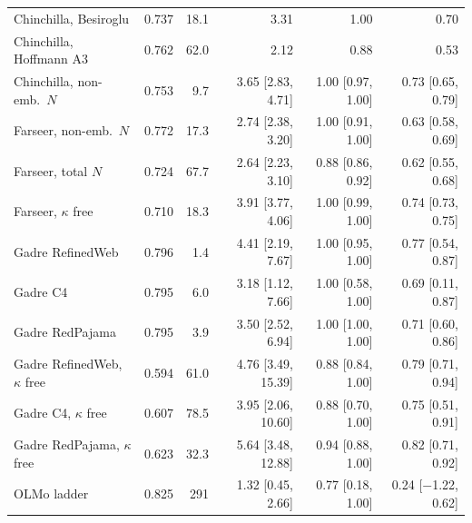 \begin{table}[tp]
{\begin{tabular}{@{}lrrrrrrr@{}}
Chinchilla, Besiroglu & 0.737 & 18.1 & \multicolumn{2}{r}{3.31} & \multicolumn{2}{r}{1.00} & 0.70 \\
Chinchilla, Hoffmann A3 & 0.762 & 62.0 & \multicolumn{2}{r}{2.12} & \multicolumn{2}{r}{0.88} & 0.53 \\
Chinchilla, non-emb.\ $N$ & 0.753 & 9.7 & \multicolumn{2}{r}{3.65 {\scriptsize[2.83, 4.71]}} & \multicolumn{2}{r}{1.00 {\scriptsize[0.97, 1.00]}} & 0.73 {\scriptsize[0.65, 0.79]} \\
Farseer, non-emb.\ $N$ & 0.772 & 17.3 & \multicolumn{2}{r}{2.74 {\scriptsize[2.38, 3.20]}} & \multicolumn{2}{r}{1.00 {\scriptsize[0.91, 1.00]}} & 0.63 {\scriptsize[0.58, 0.69]} \\
Farseer, total $N$ & 0.724 & 67.7 & \multicolumn{2}{r}{2.64 {\scriptsize[2.23, 3.10]}} & \multicolumn{2}{r}{0.88 {\scriptsize[0.86, 0.92]}} & 0.62 {\scriptsize[0.55, 0.68]} \\
Farseer, $\kappa$ free & 0.710 & 18.3 & \multicolumn{2}{r}{3.91 {\scriptsize[3.77, 4.06]}} & \multicolumn{2}{r}{1.00 {\scriptsize[0.99, 1.00]}} & 0.74 {\scriptsize[0.73, 0.75]} \\
Gadre RefinedWeb & 0.796 & 1.4 & \multicolumn{2}{r}{4.41 {\scriptsize[2.19, 7.67]}} & \multicolumn{2}{r}{1.00 {\scriptsize[0.95, 1.00]}} & 0.77 {\scriptsize[0.54, 0.87]} \\
Gadre C4 & 0.795 & 6.0 & \multicolumn{2}{r}{3.18 {\scriptsize[1.12, 7.66]}} & \multicolumn{2}{r}{1.00 {\scriptsize[0.58, 1.00]}} & 0.69 {\scriptsize[0.11, 0.87]} \\
Gadre RedPajama & 0.795 & 3.9 & \multicolumn{2}{r}{3.50 {\scriptsize[2.52, 6.94]}} & \multicolumn{2}{r}{1.00 {\scriptsize[1.00, 1.00]}} & 0.71 {\scriptsize[0.60, 0.86]} \\
Gadre RefinedWeb, $\kappa$ free & 0.594 & 61.0 & \multicolumn{2}{r}{4.76 {\scriptsize[3.49, 15.39]}} & \multicolumn{2}{r}{0.88 {\scriptsize[0.84, 1.00]}} & 0.79 {\scriptsize[0.71, 0.94]} \\
Gadre C4, $\kappa$ free & 0.607 & 78.5 & \multicolumn{2}{r}{3.95 {\scriptsize[2.06, 10.60]}} & \multicolumn{2}{r}{0.88 {\scriptsize[0.70, 1.00]}} & 0.75 {\scriptsize[0.51, 0.91]} \\
Gadre RedPajama, $\kappa$ free & 0.623 & 32.3 & \multicolumn{2}{r}{5.64 {\scriptsize[3.48, 12.88]}} & \multicolumn{2}{r}{0.94 {\scriptsize[0.88, 1.00]}} & 0.82 {\scriptsize[0.71, 0.92]} \\
OLMo ladder & 0.825 & 291 & \multicolumn{2}{r}{1.32 {\scriptsize[0.45, 2.66]}} & \multicolumn{2}{r}{0.77 {\scriptsize[0.18, 1.00]}} & 0.24 {\scriptsize[$-$1.22, 0.62]} \\

\end{tabular}}
\end{table}
